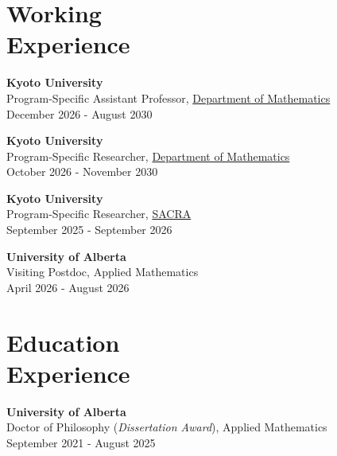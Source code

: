 \documentclass[margin]{res}
\begin{document}
\begin{resume}


\section{Working\\Experience}


\textbf{Kyoto University}\\
Program-Specific Assistant Professor, \href{https://www.math.kyoto-u.ac.jp/en}{Department of Mathematics}\\
December 2026 - August 2030 

\textbf{Kyoto University}\\
Program-Specific Researcher, \href{https://www.math.kyoto-u.ac.jp/en}{Department of Mathematics}\\
October 2026 - November 2030 

\textbf{Kyoto University}\\
Program-Specific Researcher, \href{https://sci.kyoto-u.ac.jp/en/search/tag?tag=SACRA}{SACRA}\\
September 2025 - September 2026 

\textbf{University of Alberta}\\
Visiting Postdoc, Applied Mathematics\\
April 2026 - August 2026 













\section{Education\\Experience}
\textbf{University of Alberta}\\
Doctor of Philosophy ({\sl Dissertation Award}), Applied Mathematics\\
September 2021 - August 2025



\end{resume}
\end{document}

